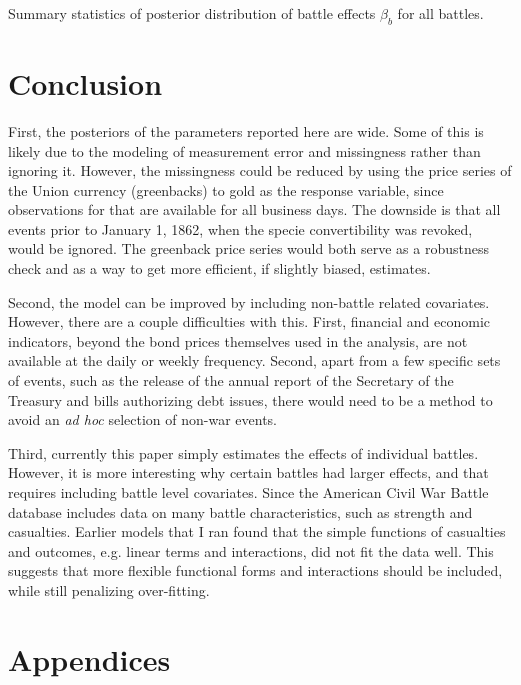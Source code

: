 \documentclass[11pt, oneside, article]{memoir}
\begin{document}
\begin{table}
  \caption{Summary statistics of posterior distribution of battle effects $\beta_b$ for all battles.}
  \label{tab:battle_effects}
\end{table}

\section{Conclusion}
\label{sec:conclusion}

First, the posteriors of the parameters reported here are wide.
Some of this is likely due to the modeling of measurement error and missingness rather than ignoring it.
However, the missingness could be reduced by using the price series of the Union currency (greenbacks) to gold as the response variable, since observations for that are available for all business days.
The downside is that all events prior to January 1, 1862, when the specie convertibility was revoked, would be ignored. 
The greenback price series would both serve as a robustness check and as a way to get more efficient, if slightly biased, estimates.

Second, the model can be improved by including non-battle related covariates.
However, there are a couple difficulties with this.
First, financial and economic indicators, beyond the bond prices themselves used in the analysis, are not available at the daily or weekly frequency.
Second, apart from a few specific sets of events, such as the release of the annual report of the Secretary of the Treasury and bills authorizing debt issues, there would need to be a method to avoid an \textit{ad hoc} selection of non-war events.

Third, currently this paper simply estimates the effects of individual battles. 
However, it is more interesting why certain battles had larger effects, and that requires including battle level covariates. 
Since the American Civil War Battle database includes data on many battle characteristics, such as strength and casualties. 
Earlier models that I ran found that the simple functions of casualties and outcomes, e.g. linear terms and interactions, did not fit the data well. 
This suggests that more flexible functional forms and interactions should be included, while still penalizing over-fitting.

\newpage

\section{Appendices}
\label{sec:appendix}
\end{document}
